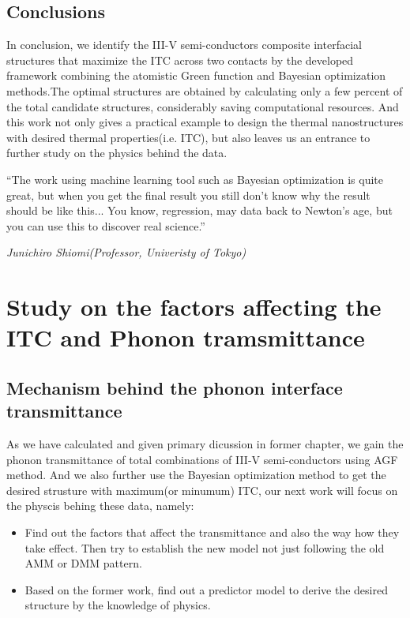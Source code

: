 \subsection{Conclusions}
In conclusion, we identify the III-V semi-conductors composite interfacial structures that maximize the ITC across two contacts by the developed framework combining the atomistic Green function and Bayesian optimization methods.The optimal structures are obtained
by calculating only a few percent of the total candidate
structures, considerably saving computational resources. And this work not only gives a practical example to design the thermal nanostructures with desired thermal properties(i.e. ITC), but also leaves us an entrance to further study on the physics behind the data.\\

\setlength{\epigraphwidth}{0.6\textwidth}
\epigraph{“The work using machine learning tool such as Bayesian optimization is quite great, but when you get the final result you still don't know why the result should be like this... You know, regression, may data back to Newton's age, but you can use this to discover real science.”}
{\textit{Junichiro Shiomi(Professor, Univeristy of Tokyo)}}
\section[Figure out the physics]{Study on the factors affecting the ITC and Phonon tramsmittance}

\subsection{Mechanism behind the phonon interface transmittance}
As we have calculated and given primary dicussion in former chapter, we gain the phonon transmittance of total combinations of III-V semi-conductors using AGF method. And we also further use the Bayesian optimization method to get the desired strusture with maximum(or minumum) ITC, our next work will focus on the physcis behing these data, namely:
\begin{itemize}
	\item Find out the factors that affect the transmittance and also the way how they take effect. Then try to establish the new model not just following the old AMM or DMM pattern.
	\item Based on the former work, find out a predictor model to derive the desired structure by the knowledge of physics.
\end{itemize}

